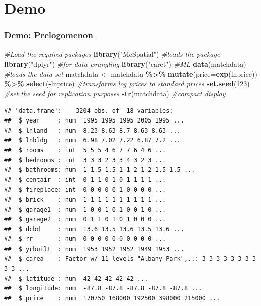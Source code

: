 \documentclass[
  shownotes,
  xcolor={svgnames},
  hyperref={colorlinks,citecolor=DarkBlue,linkcolor=DarkRed,urlcolor=DarkBlue}
  , aspectratio=169]{beamer}
\newenvironment{Shaded}{\begin{snugshade}}{\end{snugshade}}
\newcommand{\CommentTok}[1]{\textcolor[rgb]{0.56,0.35,0.01}{\textit{#1}}}
\newcommand{\DataTypeTok}[1]{\textcolor[rgb]{0.13,0.29,0.53}{#1}}
\newcommand{\DecValTok}[1]{\textcolor[rgb]{0.00,0.00,0.81}{#1}}
\newcommand{\KeywordTok}[1]{\textcolor[rgb]{0.13,0.29,0.53}{\textbf{#1}}}
\newcommand{\NormalTok}[1]{#1}
\newcommand{\OperatorTok}[1]{\textcolor[rgb]{0.81,0.36,0.00}{\textbf{#1}}}
\newcommand{\StringTok}[1]{\textcolor[rgb]{0.31,0.60,0.02}{#1}}
\begin{document}
\section{Demo}
\begin{frame}[fragile]
\frametitle{Demo: Prelogomenon}

\begin{scriptsize}
\begin{Shaded}
\begin{Highlighting}[]
\tiny
\CommentTok{\#Load the required packages}
\KeywordTok{library}\NormalTok{(}\StringTok{"McSpatial"}\NormalTok{) }\CommentTok{\#loads the package}
\KeywordTok{library}\NormalTok{(}\StringTok{"dplyr"}\NormalTok{) }\CommentTok{\#for data wrangling}
\KeywordTok{library}\NormalTok{(}\StringTok{"caret"}\NormalTok{) }\CommentTok{\#ML}
\KeywordTok{data}\NormalTok{(matchdata) }\CommentTok{\#loads the data set}
\NormalTok{matchdata \textless{}{-}}\StringTok{ }\NormalTok{matchdata }\OperatorTok{\%\textgreater{}\%}\StringTok{ }\KeywordTok{mutate}\NormalTok{(}\DataTypeTok{price=}\KeywordTok{exp}\NormalTok{(lnprice)) }\OperatorTok{\%\textgreater{}\%}\StringTok{ }\KeywordTok{select}\NormalTok{(}\OperatorTok{{-}}\NormalTok{lnprice) }
\CommentTok{\#transforms log prices to standard prices}
\KeywordTok{set.seed}\NormalTok{(}\DecValTok{123}\NormalTok{) }\CommentTok{\#set the seed for replication purposes}
\KeywordTok{str}\NormalTok{(matchdata) }\CommentTok{\#compact display}
\end{Highlighting}
\end{Shaded}
\end{scriptsize}
\begin{tiny}
\begin{verbatim}
## 'data.frame':    3204 obs. of  18 variables:
##  $ year     : num  1995 1995 1995 2005 1995 ...
##  $ lnland   : num  8.23 8.63 8.7 8.63 8.63 ...
##  $ lnbldg   : num  6.98 7.02 7.22 6.87 7.2 ...
##  $ rooms    : int  5 5 5 4 6 7 7 6 4 6 ...
##  $ bedrooms : int  3 3 3 2 3 3 4 3 2 3 ...
##  $ bathrooms: num  1 1.5 1.5 1 1 2 1 2 1.5 1.5 ...
##  $ centair  : int  0 1 1 0 1 0 1 1 1 1 ...
##  $ fireplace: int  0 0 0 0 0 1 0 0 0 0 ...
##  $ brick    : num  1 1 1 1 1 1 1 1 1 1 ...
##  $ garage1  : num  1 0 0 1 0 1 0 0 1 0 ...
##  $ garage2  : num  0 1 1 0 1 0 1 0 0 0 ...
##  $ dcbd     : num  13.6 13.5 13.6 13.5 13.6 ...
##  $ rr       : num  0 0 0 0 0 0 0 0 0 0 ...
##  $ yrbuilt  : num  1953 1952 1952 1949 1953 ...
##  $ carea    : Factor w/ 11 levels "Albany Park",..: 3 3 3 3 3 3 3 3 3 3 ...
##  $ latitude : num  42 42 42 42 42 ...
##  $ longitude: num  -87.8 -87.8 -87.8 -87.8 -87.8 ...
##  $ price    : num  170750 168000 192500 398000 215000 ...
\end{verbatim}
\end{tiny}

\end{frame}
\end{document}

